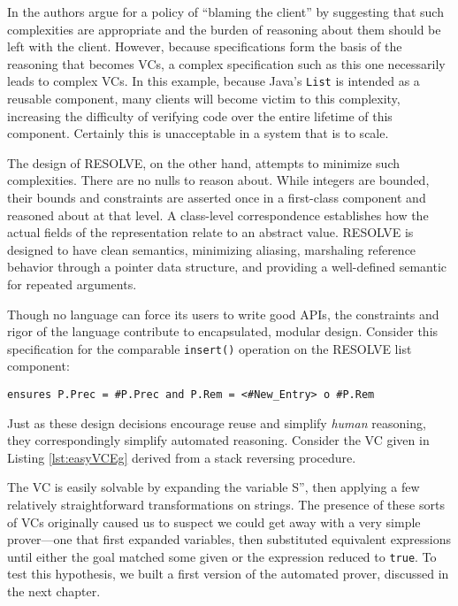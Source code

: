 In \cite{filipovic2010blaming} the authors argue for a policy of ``blaming the client'' by suggesting that such complexities are appropriate and the burden of reasoning about them should be left with the client.  However,  because specifications form the basis of the reasoning that becomes VCs, a complex specification such as this one necessarily leads to complex VCs.  In this example, because Java's \texttt{List} is intended as a reusable component, many clients will become victim to this complexity, increasing the difficulty of verifying code over the entire lifetime of this component.  Certainly this is unacceptable in a system that is to scale.

The design of RESOLVE, on the other hand, attempts to minimize such complexities.  There are no nulls to reason about.  While integers are bounded, their bounds and constraints are asserted once in a first-class component and reasoned about at that level.  A class-level correspondence establishes how the actual fields of the representation relate to an abstract value.  RESOLVE is designed to have clean semantics\cite{kul:dis}, minimizing aliasing, marshaling reference behavior through a pointer data structure, and providing a well-defined semantic for repeated arguments.

Though no language can force its users to write good APIs, the constraints and rigor of the language contribute to encapsulated, modular design.  Consider this specification for the comparable \texttt{insert()} operation on the RESOLVE list component:

\begin{lstlisting}[language=RESOLVE]
	ensures P.Prec = #P.Prec and P.Rem = <#New_Entry> o #P.Rem
\end{lstlisting}

Just as these design decisions encourage reuse and simplify \emph{human} reasoning, they correspondingly simplify automated reasoning.  Consider the VC given in Listing \ref{lst:easyVCEg} derived from a stack reversing procedure.



The VC is easily solvable by expanding the variable S'', then applying a few relatively straightforward transformations on strings.  The presence of these sorts of VCs originally caused us to suspect we could get away with a very simple prover---one that first expanded variables, then substituted equivalent expressions until either the goal matched some given or the expression reduced to \texttt{true}.  To test this hypothesis, we built a first version of the automated prover, discussed in the next chapter.

